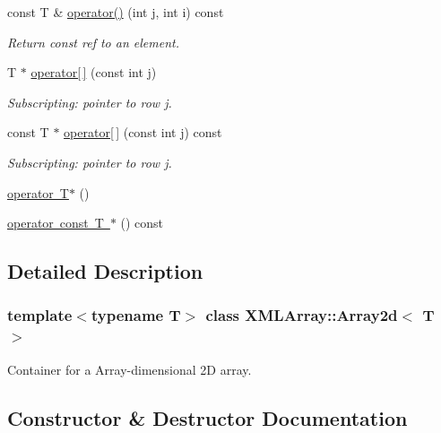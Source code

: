\begin{DoxyCompactItemize}
const T \& \mbox{\hyperlink{classXMLArray_1_1Array2d_aa02dc8ee58bd33aca0cfbbf58cbf1ba7}{operator()}} (int j, int i) const
\begin{DoxyCompactList}\small\item\em Return const ref to an element. \end{DoxyCompactList}\item 
T $\ast$ \mbox{\hyperlink{classXMLArray_1_1Array2d_a1e5b7fa596ec682113700320b08e66d5}{operator\mbox{[}$\,$\mbox{]}}} (const int j)
\begin{DoxyCompactList}\small\item\em Subscripting\+: pointer to row j. \end{DoxyCompactList}\item 
const T $\ast$ \mbox{\hyperlink{classXMLArray_1_1Array2d_a956a4739a0e6529302542b0fdf3c1da8}{operator\mbox{[}$\,$\mbox{]}}} (const int j) const
\begin{DoxyCompactList}\small\item\em Subscripting\+: pointer to row j. \end{DoxyCompactList}\item 
\mbox{\hyperlink{classXMLArray_1_1Array2d_a9d46505eb6c4149239bc87ba408c6b5b}{operator T$\ast$}} ()
\item 
\mbox{\hyperlink{classXMLArray_1_1Array2d_aabd815b03d3dfbcc079cab62408c6dfd}{operator const T $\ast$}} () const
\end{DoxyCompactItemize}


\subsection{Detailed Description}
\subsubsection*{template$<$typename T$>$\newline
class X\+M\+L\+Array\+::\+Array2d$<$ T $>$}

Container for a Array-\/dimensional 2D array. 

\subsection{Constructor \& Destructor Documentation}
\mbox{\label{classXMLArray_1_1Array2d_a2f24eccb279e2f1685b58b41f61d9330}} 
